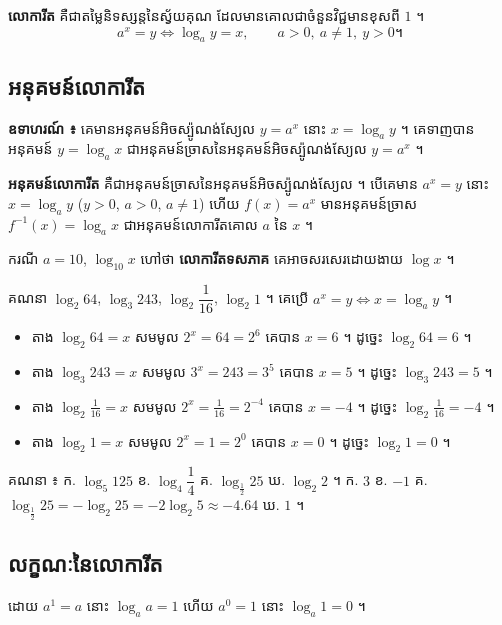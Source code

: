 \begin{definition}[និយមន័យ]
\textbf{លោការីត} គឺជាតម្លៃនិទស្សន្តនៃស្វ័យគុណ ដែលមានគោលជាចំនួនវិជ្ជមានខុសពី $1$ ។
\[
a^x = y \iff \log_a y = x, \qquad a > 0,\ a \ne 1,\ y > 0 ។
\]
\end{definition}

\subsection{អនុគមន៍លោការីត}
\textbf{ឧទាហរណ៍ ៖} គេមានអនុគមន៍អិចស្ប៉ូណង់ស្យែល $y = a^x$ នោះ $x = \log_a y$ ។ គេទាញបានអនុគមន៍ $y = \log_a x$ ជាអនុគមន៍ច្រាសនៃអនុគមន៍អិចស្ប៉ូណង់ស្យែល $y = a^x$ ។

\begin{definition}[និយមន័យ]
\textbf{អនុគមន៍លោការីត} គឺជាអនុគមន៍ច្រាសនៃអនុគមន៍អិចស្ប៉ូណង់ស្យែល ។ បើគេមាន $a^x = y$ នោះ $x = \log_a y$ ($y > 0$, $a > 0$, $a \ne 1$) ហើយ $f(x) = a^x$ មានអនុគមន៍ច្រាស $f^{-1}(x) = \log_a x$ ជាអនុគមន៍លោការីតគោល $a$ នៃ $x$ ។
\end{definition}
ករណី $a = 10$, $\log_{10} x$ ហៅថា \textbf{លោការីតទសភាគ} គេអាចសរសេរដោយងាយ $\log x$ ។

\begin{example}[លំហាត់គំរូ]
គណនា $\log_2 64$, $\log_3 243$, $\log_2\dfrac{1}{16}$, $\log_2 1$ ។
\ans
គេប្រើ $a^x = y \iff x = \log_a y$ ។
\begin{itemize}
  \item តាង $\log_2 64 = x$ សមមូល $2^x = 64 = 2^6$ គេបាន $x = 6$ ។ ដូច្នេះ $\log_2 64 = 6$ ។
  \item តាង $\log_3 243 = x$ សមមូល $3^x = 243 = 3^5$ គេបាន $x = 5$ ។ ដូច្នេះ $\log_3 243 = 5$ ។
  \item តាង $\log_2\frac{1}{16} = x$ សមមូល $2^x = \frac{1}{16} = 2^{-4}$ គេបាន $x = -4$ ។ ដូច្នេះ $\log_2\frac{1}{16} = -4$ ។
  \item តាង $\log_2 1 = x$ សមមូល $2^x = 1 = 2^0$ គេបាន $x = 0$ ។ ដូច្នេះ $\log_2 1 = 0$ ។
\end{itemize}
\end{example}

\begin{pro}
គណនា ៖ \quad ក. $\log_5 125$ \quad ខ. $\log_4\dfrac{1}{4}$ \quad គ. $\log_{\frac{1}{2}} 25$ \quad ឃ. $\log_2 2$ ។
\ans
ក. $3$ \quad ខ. $-1$ \quad គ. $\log_{\frac{1}{2}} 25 = -\log_2 25 = -2\log_2 5 \approx -4.64$ \quad ឃ. $1$ ។
\end{pro}

\subsection{លក្ខណៈនៃលោការីត}
ដោយ $a^1 = a$ នោះ $\log_a a = 1$ ហើយ $a^0 = 1$ នោះ $\log_a 1 = 0$ ។

